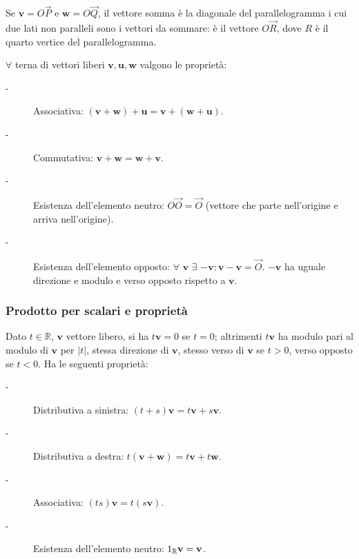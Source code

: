\documentclass{article}
\begin{document}
Se $\mathbf{v}=O\vec{P}$ e $\mathbf{w}=O\vec{Q}$, il vettore somma \`{e} la
diagonale del parallelogramma i cui due lati non paralleli sono i vettori da
sommare: \`{e} il vettore $O\vec{R}$, dove $R$ \`{e} il quarto vertice del
parallelogramma.

$\forall $ terna di vettori liberi $\mathbf{v,u,w}$ valgono le propriet\`{a}:

\begin{description}
\item[-] Associativa: $\left( \mathbf{v+w}\right) +\mathbf{u=v}+\left( 
\mathbf{w+u}\right) $.

\item[-] Commutativa: $\mathbf{v+w=w+v}$.

\item[-] Esistenza dell'elemento neutro: $O\vec{O}=\vec{O}$ (vettore che
parte nell'origine e arriva nell'origine).

\item[-] Esistenza dell'elemento opposto: $\forall $ $\mathbf{v}$ $\exists $ 
$-\mathbf{v}:\mathbf{v-v}=\vec{O}$. $-\mathbf{v}$ ha uguale direzione e
modulo e verso opposto rispetto a $\mathbf{v}$.
\end{description}

\subsubsection{Prodotto per scalari e propriet\`{a}}

Dato $t\in 
\mathbb{R}
$, $\mathbf{v}$ vettore libero, si ha $t\mathbf{v}=0$ se $t=0$; altrimenti $t%
\mathbf{v}$ ha modulo pari al modulo di $\mathbf{v}$ per $\left\vert
t\right\vert $, stessa direzione di $\mathbf{v}$, stesso verso di $\mathbf{v}
$ se $t>0$, verso opposto se $t<0$. Ha le seguenti propriet\`{a}:

\begin{description}
\item[-] Distributiva a sinistra: $\left( t+s\right) \mathbf{v}=t\mathbf{v}+s%
\mathbf{v}$.

\item[-] Distributiva a destra: $t\left( \mathbf{v+w}\right) =t\mathbf{v}+t%
\mathbf{w}$.

\item[-] Associativa: $\left( ts\right) \mathbf{v}=t\left( s\mathbf{v}%
\right) $.

\item[-] Esistenza dell'elemento neutro: $1_{\mathbf{%
\mathbb{R}
}}\mathbf{v=v}$.
\end{description}
\end{document}
